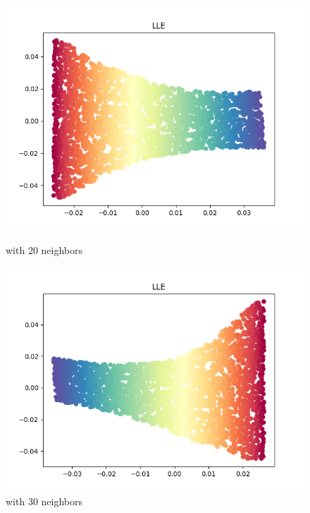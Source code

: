 \documentclass[8pt]{article}
\begin{document}
\begin{figure}[H]
\begin{minipage}{0.32\textwidth}
        \includegraphics[width=\textwidth]{./Prob1/task2/out/check/task2LLECheck_nei_20.png}
        \caption{with 20 neighbors}
        \label{fig:Swiss Roll after LLE with 20 neighbors}
    \end{minipage}
    \hfill
    \begin{minipage}{0.32\textwidth}
        \includegraphics[width=\textwidth]{./Prob1/task2/out/check/task2LLECheck_nei_30.png}
        \caption{with 30 neighbors}
        \label{fig:Swiss Roll after LLE with 30 neighbors}
    \end{minipage}
    \hfill
    \begin{minipage}{0.32\textwidth}

\end{minipage}
\end{figure}
\end{document}
